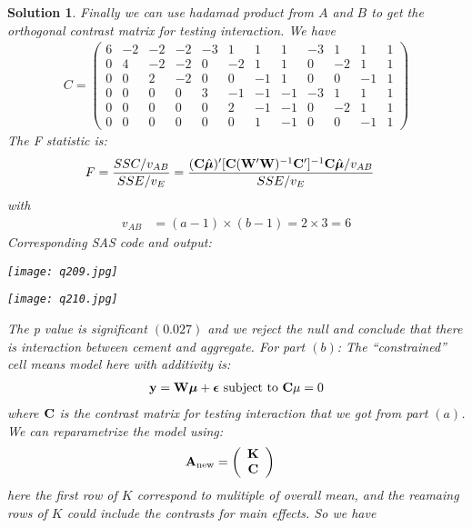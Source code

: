 \documentclass[11pt]{article}
\newtheorem{sol}{Solution}
\begin{document}
\begin{sol}
	Finally we can use hadamad product from $A$ and $B$ to get the orthogonal contrast matrix for testing interaction. We have
	\begin{align*}
		C = \left(\begin{array}{cccccccccccc} 6&-2&-2&-2&-3&1&1&1&-3&1&1&1\\  0&4&-2&-2&0&-2&1&1&0&-2&1&1\\  0&0&2&-2&0&0&-1&1&0&0&-1&1\\
		0&0&0&0&3&-1&-1&-1&-3&1&1&1\\  0&0&0&0&0&2&-1&-1&0&-2&1&1 \\  0&0&0&0&0&0&1&-1&0&0&-1&1\end{array}\right)
	\end{align*}
	The F statistic is:
	\begin{align*}
		F &= \frac{SSC/v_{AB}}{SSE/v_E}= \frac{({\bf C}\hat{{\bm\mu}})'[{\bf C}({\bf W}'{\bf W})^{-1}{\bf C}']^{-1}{\bf C}\hat{{\bm\mu}}/v_{AB}}{SSE/v_E}
	\end{align*}
	with 
	\begin{align*}
		v_{AB} &= (a - 1)\times (b - 1) = 2 \times 3 = 6
	\end{align*}
	Corresponding SAS code and output:
	\begin{center}
		\texttt{[image: q209.jpg]}
	\end{center}
	\begin{center}
		\texttt{[image: q210.jpg]}
	\end{center}
	The p value is significant $(0.027)$ and we reject the null and conclude that there is interaction between cement and aggregate.
     \vskip 2mm
     For part $(b)$:\vskip 2mm
     The ``constrained'' cell means model here with additivity is:
     \begin{align*}
     	{\bf y} = {\bf W}{\bm\mu} + {\bm \epsilon} \text{ subject to } {\bf C}{\bf \mu} = 0
     \end{align*}
     where ${\bf C}$ is the contrast matrix for testing interaction that we got from part $(a)$.\vskip 2mm
     We can reparametrize the model using:
     \begin{align*}
          {\bf A}_{\text{new}} &= \left(\begin{array}{c} {\bf K}\\ {\bf C}\end{array}\right)
     \end{align*}
     here the first row of $K$ correspond to mulitiple of overall mean, and the reamaing rows of $K$ could include the contrasts for main effects. So we have

\end{sol}
\end{document}
